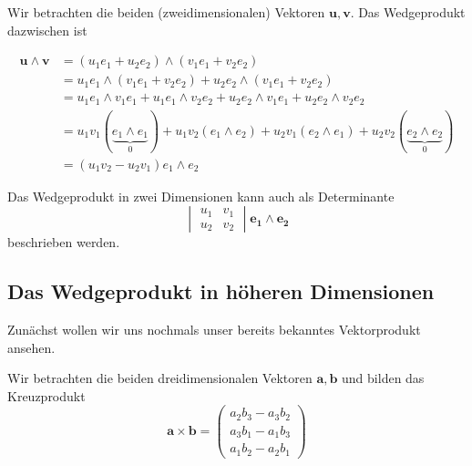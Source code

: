 \begin{definition}
  Wir betrachten die beiden (zweidimensionalen) Vektoren $\mathbf{u},
  \mathbf{v}$.
  Das Wedgeprodukt dazwischen ist

  \begin{equation}
    \begin{aligned}
    \mathbf{u} \wedge \mathbf{v} &= (u_1 e_1 + u_2 e_2) \wedge
    (v_1 e_1 + v_2 e_2) \\
    &= u_1 e_1 \wedge (v_1 e_1 + v_2 e_2) + u_2 e_2 \wedge (v_1 e_1 + v_2 e_2) \\
    &= u_1 e_1 \wedge v_1 e_1 + u_1 e_1 \wedge v_2 e_2 + u_2 e_2 \wedge v_1 e_1 + u_2 e_2 \wedge v_2 e_2 \\
    &= u_1 v_1 (\underbrace{e_1 \wedge e_1}_{0}) + u_1 v_2 (e_1 \wedge e_2) + u_2 v_1 (e_2 \wedge e_1) + u_2 v_2 (\underbrace{e_2 \wedge e_2}_{0}) \\
    &= (u_1 v_2 - u_2 v_1) e_1 \wedge e_2
    \end{aligned}
  \end{equation}
\end{definition}

Das Wedgeprodukt in zwei Dimensionen kann auch als Determinante
\begin{equation}
  \begin{vmatrix}
    u_1 & v_1 \\
    u_2 & v_2
  \end{vmatrix}
  \mathbf{e_1} \wedge \mathbf{e_2}
\end{equation}
beschrieben werden.

\subsection{Das Wedgeprodukt in höheren Dimensionen}
Zunächst wollen wir uns nochmals unser bereits bekanntes
Vektorprodukt ansehen.
\begin{definition}
  Wir betrachten die beiden dreidimensionalen Vektoren $\mathbf{a}, \mathbf{b}$
  und bilden das Kreuzprodukt
  \begin{equation}
    \mathbf{a} \times \mathbf{b} = \begin{pmatrix} a_2 b_3 - a_3 b_2 \\ a_3 b_1 - a_1 b_3 \\ a_1 b_2 - a_2 b_1 \end{pmatrix}
    \label{geoalgebra:eq:vektorprodukt}
  \end{equation}
  
\end{definition}

